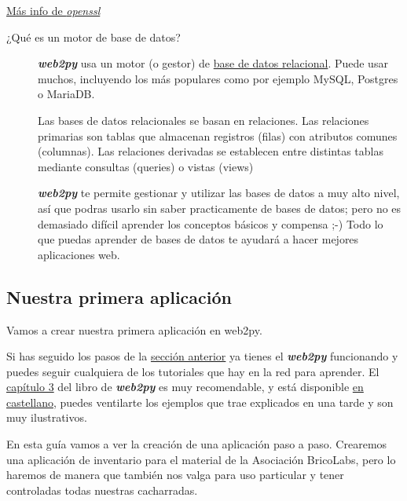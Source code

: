 \documentclass[
  12pt,
  spanish,
]{article}
\begin{document}
\href{https://www.digitalocean.com/community/tutorials/openssl-essentials-working-with-ssl-certificates-private-keys-and-csrs}{Más
info de \emph{openssl}}

\begin{description}
\item[¿Qué es un motor de base de datos?]
\textbf{\emph{web2py}} usa un motor (o gestor) de
\href{https://es.wikipedia.org/wiki/Base_de_datos_relacional}{base de
datos relacional}. Puede usar muchos, incluyendo los más populares como
por ejemplo MySQL, Postgres o MariaDB.

Las bases de datos relacionales se basan en relaciones. Las relaciones
primarias son tablas que almacenan registros (filas) con atributos
comunes (columnas). Las relaciones derivadas se establecen entre
distintas tablas mediante consultas (queries) o vistas (views)

\textbf{\emph{web2py}} te permite gestionar y utilizar las bases de
datos a muy alto nivel, así que podras usarlo sin saber practicamente de
bases de datos; pero no es demasiado difícil aprender los conceptos
básicos y compensa ;-) Todo lo que puedas aprender de bases de datos te
ayudará a hacer mejores aplicaciones web.
\end{description}

\hypertarget{nuestra-primera-aplicaciuxf3n}{%
\subsection{Nuestra primera
aplicación}\label{nuestra-primera-aplicaciuxf3n}}

Vamos a crear nuestra primera aplicación en web2py.

Si has seguido los pasos de la
\protect\hyperlink{instalaciuxf3n}{sección anterior} ya tienes el
\textbf{\emph{web2py}} funcionando y puedes seguir cualquiera de los
tutoriales que hay en la red para aprender. El
\href{http://web2py.com/books/default/chapter/29/03/overview}{capítulo
3} del libro de \textbf{\emph{web2py}} es muy recomendable, y está
disponible
\href{http://web2py.com/books/default/chapter/41/03/resumen}{en
castellano}, puedes ventilarte los ejemplos que trae explicados en una
tarde y son muy ilustrativos.

En esta guía vamos a ver la creación de una aplicación paso a paso.
Crearemos una aplicación de inventario para el material de la Asociación
BricoLabs, pero lo haremos de manera que también nos valga para uso
particular y tener controladas todas nuestras cacharradas.
\end{document}
